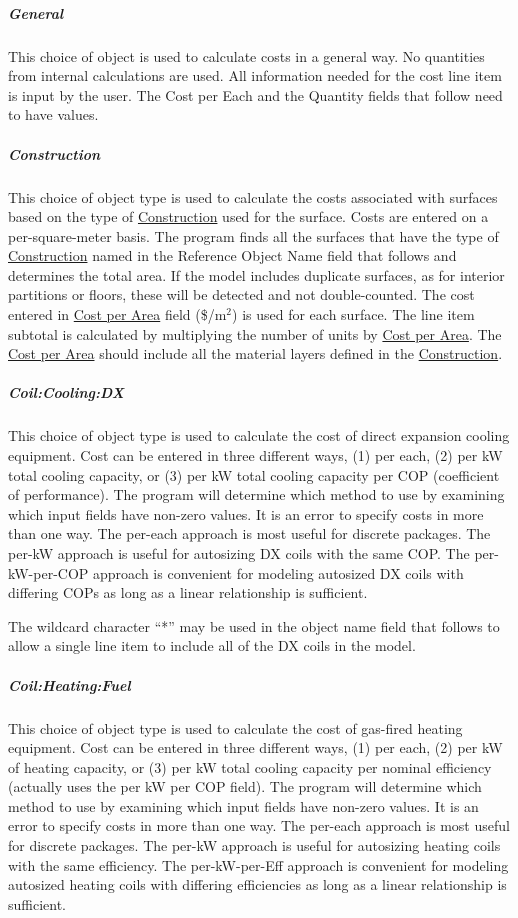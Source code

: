 \subparagraph{General}\label{general}


This choice of object is used to calculate costs in a general way. No quantities from internal calculations are used. All information needed for the cost line item is input by the user. The Cost per Each and the Quantity fields that follow need to have values.

\subparagraph{Construction}\label{construction-costlineitem}

This choice of object type is used to calculate the costs associated with surfaces based on the type of \hyperref[construction-000]{Construction} used for the surface. Costs are entered on a per-square-meter basis. The program finds all the surfaces that have the type of \hyperref[construction-000]{Construction} named in the Reference Object Name field that follows and determines the total area. If the model includes duplicate surfaces, as for interior partitions or floors, these will be detected and not double-counted. The cost entered in \hyperref[field-cost-per-area]{Cost per Area} field (\$/m\(^{2}\)) is used for each surface. The line item subtotal is calculated by multiplying the number of units by \hyperref[field-cost-per-area]{Cost per Area}. The \hyperref[field-cost-per-area]{Cost per Area} should include all the material layers defined in the \hyperref[construction-000]{Construction}.

\subparagraph{Coil:Cooling:DX}\label{coildx-or-coilcoolingdxsinglespeed}

This choice of object type is used to calculate the cost of direct expansion cooling equipment. Cost can be entered in three different ways, (1) per each, (2) per kW total cooling capacity, or (3) per kW total cooling capacity per COP (coefficient of performance). The program will determine which method to use by examining which input fields have non-zero values. It is an error to specify costs in more than one way. The per-each approach is most useful for discrete packages. The per-kW approach is useful for autosizing DX coils with the same COP. The per-kW-per-COP approach is convenient for modeling autosized DX coils with differing COPs as long as a linear relationship is sufficient.

The wildcard character ``*'' may be used in the object name field that follows to allow a single line item to include all of the DX coils in the model.

\subparagraph{Coil:Heating:Fuel}\label{coilheatinggas}

This choice of object type is used to calculate the cost of gas-fired heating equipment. Cost can be entered in three different ways, (1) per each, (2) per kW of heating capacity, or (3) per kW total cooling capacity per nominal efficiency (actually uses the per kW per COP field). The program will determine which method to use by examining which input fields have non-zero values. It is an error to specify costs in more than one way. The per-each approach is most useful for discrete packages. The per-kW approach is useful for autosizing heating coils with the same efficiency. The per-kW-per-Eff approach is convenient for modeling autosized heating coils with differing efficiencies as long as a linear relationship is sufficient.

